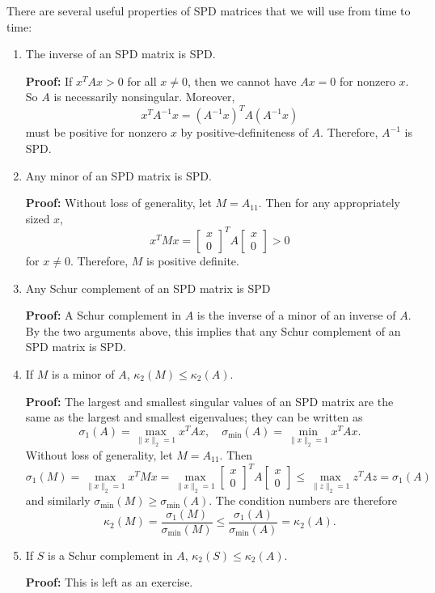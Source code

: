 \documentclass[12pt, leqno]{article} %
\begin{document}
There are several useful properties of SPD matrices that we will
use from time to time:
\begin{enumerate}
\item
  The inverse of an SPD matrix is SPD.

  {\bf Proof:}
  If $x^T A x > 0$ for all $x \neq 0$, then we cannot have $Ax = 0$
  for nonzero $x$.  So $A$ is necessarily nonsingular.  Moreover,
  \[
    x^T A^{-1} x = (A^{-1} x)^T A (A^{-1} x)
  \]
  must be positive for nonzero $x$ by positive-definiteness of $A$.
  Therefore, $A^{-1}$ is SPD.

\item
  Any minor of an SPD matrix is SPD.

  {\bf Proof:}
  Without loss of generality, let $M = A_{11}$.  Then for any appropriately
  sized $x$,
  \[
    x^T M x = \begin{bmatrix} x \\ 0 \end{bmatrix}^T A \begin{bmatrix} x \\ 0 \end{bmatrix} > 0
  \]
  for $x \neq 0$.  Therefore, $M$ is positive definite.

\item
  Any Schur complement of an SPD matrix is SPD

  {\bf Proof:}
  A Schur complement in $A$ is the inverse of a minor of an inverse of $A$.
  By the two arguments above, this implies that any Schur complement of
  an SPD matrix is SPD.

\item If $M$ is a minor of $A$, $\kappa_2(M) \leq \kappa_2(A)$.

  {\bf Proof:}
  The largest and smallest singular values of an SPD matrix are the
  same as the largest and smallest eigenvalues; they can be written
  as
  \[
    \sigma_1(A) = \max_{\|x\|_2 = 1} x^T A x, \quad
    \sigma_{\min}(A) = \min_{\|x\|_2 = 1} x^T A x.
  \]
  Without loss of generality, let $M = A_{11}$.  Then
  \[
    \sigma_1(M)
    = \max_{\|x\|_2 = 1} x^T M x
    = \max_{\|x\|_2 = 1}
      \begin{bmatrix} x \\ 0 \end{bmatrix}^T A
      \begin{bmatrix} x \\ 0 \end{bmatrix}
    \leq \max_{\|z\|_2 = 1} z^T A z = \sigma_1(A)
  \]
  and similarly $\sigma_{\min}(M) \geq \sigma_{\min}(A)$.
  The condition numbers are therefore
  \[
    \kappa_2(M) =
    \frac{\sigma_1(M)}{\sigma_{\min}(M)} \leq
    \frac{\sigma_1(A)}{\sigma_{\min}(A)} = \kappa_2(A).
  \]

\item If $S$ is a Schur complement in $A$, $\kappa_2(S) \leq \kappa_2(A)$.

  {\bf Proof:}  This is left as an exercise.
\end{enumerate}
\end{document}
